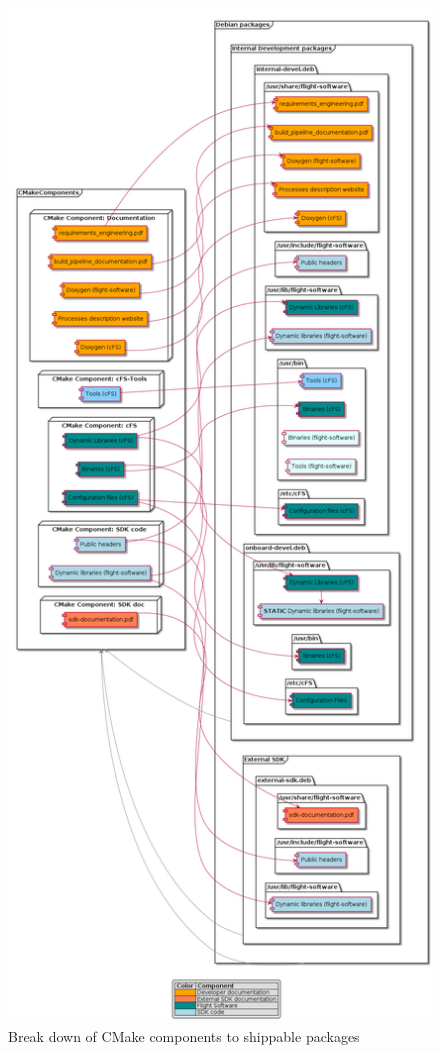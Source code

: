 \begin{figure}[H]
    \centering
    \includegraphics[width=\textwidth,height=\textheight,keepaspectratio]{diagrams/artefact_generation.png}
    \caption{Break down of CMake components to shippable packages}
    \label{fig-cmake-components-to-packages}
\end{figure}
